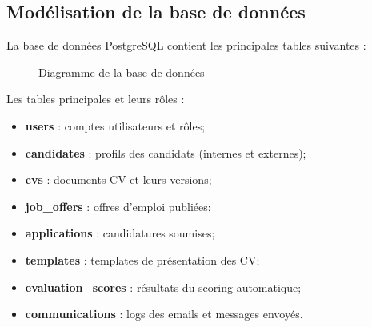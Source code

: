 \subsection{Modélisation de la base de données}
\label{subsec:modelisation-bd}

La base de données PostgreSQL contient les principales tables suivantes :

\begin{figure}[!ht]
    \centering
    \caption{Diagramme de la base de données}
    \label{fig:schema-bd}
\end{figure}

Les tables principales et leurs rôles :

\begin{itemize}
    \item \textbf{users} : comptes utilisateurs et rôles;
    
    \item \textbf{candidates} : profils des candidats (internes et externes);
    
    \item \textbf{cvs} : documents CV et leurs versions;
    
    \item \textbf{job\_offers} : offres d'emploi publiées;
    
    \item \textbf{applications} : candidatures soumises;
    
    \item \textbf{templates} : templates de présentation des CV;
    
    \item \textbf{evaluation\_scores} : résultats du scoring automatique;
    
    \item \textbf{communications} : logs des emails et messages envoyés.
\end{itemize}


